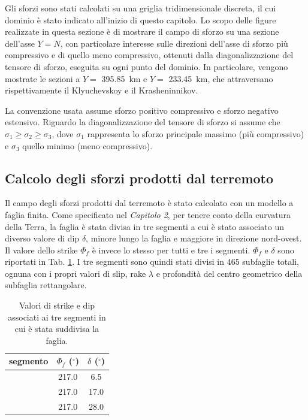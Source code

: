 Gli sforzi sono stati calcolati su una griglia tridimensionale discreta, il cui dominio è stato indicato all'inizio di questo capitolo.
Lo scopo delle figure realizzate in questa sezione è di mostrare il campo di sforzo su una sezione dell'asse \(Y=N\), con particolare interesse sulle direzioni dell'asse di sforzo più compressivo e di quello meno compressivo, ottenuti dalla diagonalizzazione del tensore di sforzo, eseguita su ogni punto del dominio. In particolare, vengono mostrate le sezioni a \(Y=\) \qty{395.85}{\kilo\meter} e \(Y=\) \qty{233.45}{\kilo\meter}, che attraversano rispettivamente il Klyuchevskoy e il Krasheninnikov.

La convenzione usata assume sforzo positivo compressivo e sforzo negativo estensivo.
Riguardo la diagonalizzazione del tensore di sforzo si assume che \( \sigma_1 \ge \sigma_2 \ge \sigma_3 \), dove \(\sigma_1\) rappresenta lo sforzo principale massimo (più compressivo) e \(\sigma_3\) quello minimo (meno compressivo).

\subsection{Calcolo degli sforzi prodotti dal terremoto}
Il campo degli sforzi prodotti dal terremoto è stato calcolato con un modello a faglia finita.
Come specificato nel \textit{Capitolo 2}, per tenere conto della curvatura della Terra, la faglia è stata divisa in tre segmenti a cui è stato associato un diverso valore di dip \(\delta\), minore lungo la faglia e maggiore in direzione nord-ovest.
Il valore dello strike \(\Phi_f\) è invece lo stesso per tutti e tre i segmenti. \(\Phi_f\) e \(\delta\) sono riportati in Tab. \ref{tab:segmenti}. I tre segmenti sono quindi stati divisi in 465 subfaglie totali, ognuna con i propri valori di slip, rake \(\lambda\) e profondità del centro geometrico della subfaglia rettangolare.

\begin{table}[H]
    \centering
    \begin{tabular}{ccc}
    \toprule
        segmento & \(\Phi_f\) (\(^\circ\)) & \(\delta\) (\(^\circ\)) \\
    \midrule
        \romannumeral 1 & 217.0 & 6.5 \\
        \romannumeral 2 & 217.0 & 17.0 \\
        \romannumeral 3 & 217.0 & 28.0 \\
    \bottomrule
    \end{tabular}
    \caption{Valori di strike e dip associati ai tre segmenti in cui è stata suddivisa la faglia.}
    \label{tab:segmenti}
\end{table}

